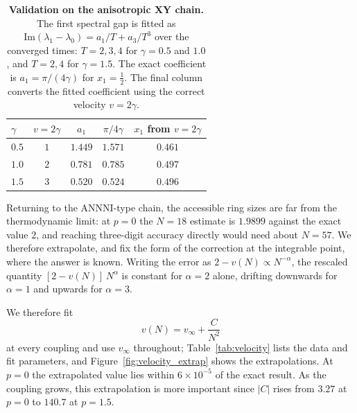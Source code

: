 \begin{table}[htbp]
  \centering
  \begin{tabular}{lcccc}
    \hline
    $\gamma$ & $v=2\gamma$ & $a_1$   & $\pi/4\gamma$ & $x_1$ from $v=2\gamma$ \\
    \hline
    $0.5$    & $1$         & $1.449$ & $1.571$       & $0.461$                \\
    $1.0$    & $2$         & $0.781$ & $0.785$       & $0.497$                \\
    $1.5$    & $3$         & $0.520$ & $0.524$       & $0.496$                \\
    \hline
  \end{tabular}
  \caption{\textbf{Validation on the anisotropic XY chain.} The first spectral gap is fitted as $\mathrm{Im}(\lambda_1-\lambda_0)=a_1/T+a_3/T^3$ over the converged times: $T=2,3,4$ for $\gamma=0.5$ and $1.0$, and $T=2,4$ for $\gamma=1.5$. The exact coefficient is $a_1=\pi/(4\gamma)$ for $x_1=\tfrac12$. The final column converts the fitted coefficient using the correct velocity $v=2\gamma$.}
  \label{tab:xy}
\end{table}

Returning to the \ac{ANNNI}-type chain, the accessible ring sizes are far from the thermodynamic limit: at $p=0$ the $N=18$ estimate is $1.9899$ against the exact value $2$, and reaching three-digit accuracy directly would need about $N=57$. We therefore extrapolate, and fix the form of the correction at the integrable point, where the answer is known. Writing the error as $2-v(N)\propto N^{-\alpha}$, the rescaled quantity $[2-v(N)]\,N^{\alpha}$ is constant for $\alpha=2$ alone, drifting downwards for $\alpha=1$ and upwards for $\alpha=3$.

We therefore fit
\begin{equation}
  v(N)=v_\infty+\frac{C}{N^2}
  \label{eq:app:velocity_fit}
\end{equation}
at every coupling and use $v_\infty$ throughout; Table~\ref{tab:velocity} lists the data and fit parameters, and Figure~\ref{fig:velocity_extrap} shows the extrapolations. At $p=0$ the extrapolated value lies within $6\times10^{-5}$ of the exact result. As the coupling grows, this extrapolation is more important since $|C|$ rises from $3.27$ at $p=0$ to $140.7$ at $p=1.5$.

